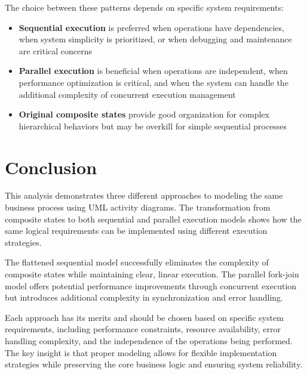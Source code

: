 \documentclass[a4paper,12pt]{article}
\begin{document}
The choice between these patterns depends on specific system requirements:

\begin{itemize}
  \item \textbf{Sequential execution} is preferred when operations have dependencies, when system simplicity is prioritized, or when debugging and maintenance are critical concerns
  \item \textbf{Parallel execution} is beneficial when operations are independent, when performance optimization is critical, and when the system can handle the additional complexity of concurrent execution management
  \item \textbf{Original composite states} provide good organization for complex hierarchical behaviors but may be overkill for simple sequential processes
\end{itemize}

\section*{Conclusion}

This analysis demonstrates three different approaches to modeling the same business process using UML activity diagrams. The transformation from composite states to both sequential and parallel execution models shows how the same logical requirements can be implemented using different execution strategies.

The flattened sequential model successfully eliminates the complexity of composite states while maintaining clear, linear execution. The parallel fork-join model offers potential performance improvements through concurrent execution but introduces additional complexity in synchronization and error handling.

Each approach has its merits and should be chosen based on specific system requirements, including performance constraints, resource availability, error handling complexity, and the independence of the operations being performed. The key insight is that proper modeling allows for flexible implementation strategies while preserving the core business logic and ensuring system reliability.
\end{document}
